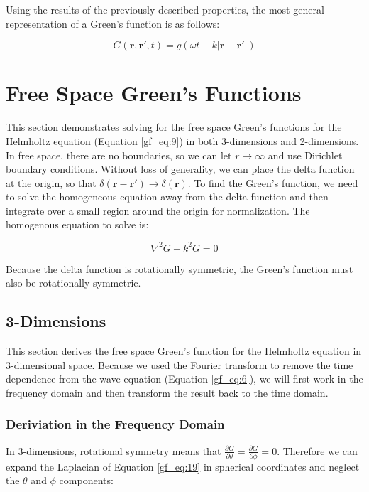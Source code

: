 Using the results of the previously described properties, the most general representation of a Green's function is as follows:

\begin{equation}
G\left(\mathbf{r},\mathbf{r}',t \right) = g\left(\omega t - k| \mathbf{r} - \mathbf{r}' | \right)
\label{gf_eq:19b}
\end{equation}
\renewcommand{\baselinestretch}{2} \small\normalsize

\section{Free Space Green's Functions}
This section demonstrates solving for the free space Green's functions for the Helmholtz equation (Equation \ref{gf_eq:9}) in both 3-dimensions and 2-dimensions. In free space, there are no boundaries, so we can let $r\rightarrow \infty$ and use Dirichlet boundary conditions. Without loss of generality, we can place the delta function at the origin, so that $\delta\left(\mathbf{r}-\mathbf{r}' \right) \rightarrow \delta \left(\mathbf{r} \right)$. To find the Green's function, we need to solve the homogeneous equation away from the delta function and then integrate over a small region around the origin for normalization. The homogenous equation to solve is:

\begin{equation}
\nabla^2G+ k^2G = 0
\label{gf_eq:19}
\end{equation}
\renewcommand{\baselinestretch}{2} \small\normalsize

Because the delta function is rotationally symmetric, the Green's function must also be rotationally symmetric.

\subsection{3-Dimensions}\label{gf_sec:3d}
This section derives the free space Green's function for the Helmholtz equation in 3-dimensional space. Because we used the Fourier transform to remove the time dependence from the wave equation (Equation 
\ref{gf_eq:6}), we will first work in the frequency domain and then transform the result back to the time domain.

\subsubsection{Deriviation in the Frequency Domain}
In 3-dimensions,  rotational symmetry means that  $\frac{\partial G}{\partial\theta} = \frac{\partial G}{\partial\phi}=0$. Therefore we can expand the Laplacian of Equation \ref{gf_eq:19} in spherical coordinates and neglect the $\theta$ and $\phi$ components:

